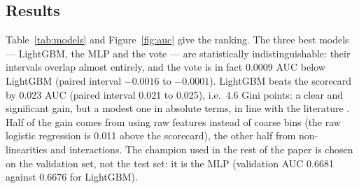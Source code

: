 \documentclass[11pt,a4paper]{article}
\begin{document}
\begin{table}[H]
\centering
\small
\caption{Test set (161{,}997 loans issued July--December 2015). Values with 95\% bootstrap intervals for AUC and Gini. Lower Brier is better.}
\label{tab:models}
\end{table}

\subsection{Results}
Table~\ref{tab:models} and Figure~\ref{fig:auc} give the ranking. The three best models --- LightGBM, the MLP and the vote --- are statistically indistinguishable: their intervals overlap almost entirely, and the vote is in fact 0.0009 AUC below LightGBM (paired interval $-0.0016$ to $-0.0001$). LightGBM beats the scorecard by 0.023 AUC (paired interval 0.021 to 0.025), i.e.\ 4.6 Gini points: a clear and significant gain, but a modest one in absolute terms, in line with the literature \citep{lessmann2015}. Half of the gain comes from using raw features instead of coarse bins (the raw logistic regression is 0.011 above the scorecard), the other half from non-linearities and interactions. The champion used in the rest of the paper is chosen on the validation set, not the test set: it is the MLP (validation AUC 0.6681 against 0.6676 for LightGBM).
\end{document}
